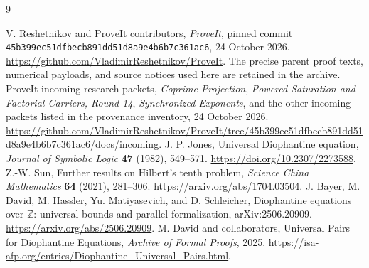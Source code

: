 \documentclass[11pt]{article}
\newcommand{\Z}{\mathbb Z}
\theoremstyle{definition}\newtheorem{definition}[theorem]{Definition}
\theoremstyle{remark}\newtheorem{remark}[theorem]{Remark}
\begin{document}
\clearpage
\begin{thebibliography}{9}
\raggedright
{} V. Reshetnikov and ProveIt contributors,
\emph{ProveIt}, pinned commit
\texttt{45b399ec51dfbecb891dd51d8a9e4b6b7c361ac6}, 24 October 2026.
\url{https://github.com/VladimirReshetnikov/ProveIt}.
The precise parent proof texts, numerical payloads, and source notices
used here are retained in the archive.
 ProveIt incoming research packets,
\emph{Coprime Projection}, \emph{Powered Saturation and Factorial Carriers,
Round 14}, \emph{Synchronized Exponents}, and the other incoming packets
listed in the provenance inventory, 24 October 2026.
\url{https://github.com/VladimirReshetnikov/ProveIt/tree/45b399ec51dfbecb891dd51d8a9e4b6b7c361ac6/docs/incoming}.
 J. P. Jones, Universal Diophantine equation,
\emph{Journal of Symbolic Logic} \textbf{47} (1982), 549--571.
\url{https://doi.org/10.2307/2273588}.
 Z.-W. Sun, Further results on Hilbert's tenth problem,
\emph{Science China Mathematics} \textbf{64} (2021), 281--306.
\url{https://arxiv.org/abs/1704.03504}.
 J. Bayer, M. David, M. Hassler, Yu. Matiyasevich,
and D. Schleicher, Diophantine equations over $\Z$: universal bounds and
parallel formalization, arXiv:2506.20909.
\url{https://arxiv.org/abs/2506.20909}.
 M. David and collaborators, Universal Pairs for Diophantine
Equations, \emph{Archive of Formal Proofs}, 2025.
\url{https://isa-afp.org/entries/Diophantine_Universal_Pairs.html}.
\end{thebibliography}
\end{document}
